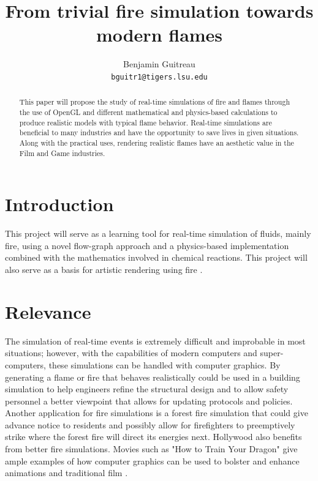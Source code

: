 \documentclass[11pt,twocolumn]{article}
\title{From trivial fire simulation towards modern flames}
\author{Benjamin Guitreau\\
  \texttt{bguitr1@tigers.lsu.edu}}
\begin{document}
	\maketitle
	
	\begin{abstract}
		This paper will propose the study of real-time simulations of fire and flames through the use of OpenGL and different mathematical and physics-based calculations to produce realistic models with typical flame behavior. Real-time simulations are beneficial to many industries and have the opportunity to save lives in given situations. Along with the practical uses, rendering realistic flames have an aesthetic value in the Film and Game industries.
	\end{abstract}
	
	\section{Introduction}
		This project will serve as a learning tool for real-time simulation of fluids, mainly fire, using a novel flow-graph approach \cite{Zhang:2011:GFS:2019406.2019431} and a physics-based implementation \cite{Hong:2007:WFC:1276377.1276436} combined with the mathematics involved in chemical reactions. This project will also serve as a basis for artistic rendering using fire \cite{Bangalore:2012:TAD:2328888.2328896}.
		
	\section{Relevance}
	The simulation of real-time events is extremely difficult and improbable in most situations; however, with the capabilities of modern computers and super-computers, these simulations can be handled with computer graphics. By generating a flame or fire that behaves realistically could be used in a building simulation to help engineers refine the structural design and to allow safety personnel a better viewpoint that allows for updating protocols and policies. Another application for fire simulations is a forest fire simulation that could give advance notice to residents and possibly allow for firefighters to preemptively strike where the forest fire will direct its energies next. Hollywood also benefits from better fire simulations. Movies such as "How to Train Your Dragon" give ample examples of how computer graphics can be used to bolster and enhance animations and traditional film \cite{Robertson:2010:TE}.
	
\end{document}
